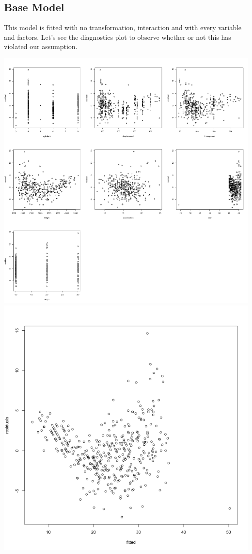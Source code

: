 \documentclass[11pt]{article} %
\begin{document}
\subsection{Base Model}
This model is fitted with no transformation, interaction and with every variable and factors. Let's see the diagnostics plot to observe whether or not this has violated our assumption.
\begin{center}
\includegraphics[scale=0.13]{1_res_vs_value}
\includegraphics[scale=0.2]{1_res_vs_fitted}
\end{center}
\end{document}
